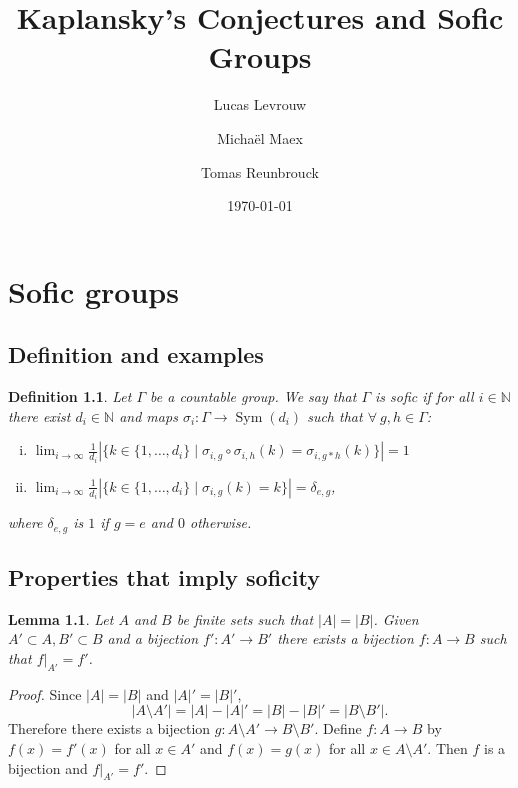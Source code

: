 \documentclass[a4paper]{report}
\author{Lucas Levrouw \and Michaël Maex \and Tomas Reunbrouck}
\title{Kaplansky's Conjectures and Sofic Groups}
\date{\today}
\newcommand{\N}{\mathbb{N}}
\newcommand{\card}[1]{\left| #1 \right|}
\DeclareMathOperator{\sym}{Sym}
\newtheorem{definition}{Definition}
\newtheorem{lemma}{Lemma}
\begin{document}
    \maketitle
    \chapter{Sofic groups}

\section{Definition and examples}

    \begin{definition}\label{def:Sophic}
        Let $\Gamma$ be a countable group. We say that $\Gamma$ is sofic if for all $i\in \N$ there exist $d_i \in \N$ and maps $\sigma_i : \Gamma \to \sym(d_i)$ such that $\forall\ g, h \in \Gamma$:
        \begin{enumerate}[(i)]
            \item $\displaystyle \lim_{i\to \infty} \frac{1}{d_i} \card{\big\{k \in \{1, \dots, d_i\} \mid \sigma_{i,g} \circ \sigma_{i,h}(k) = \sigma_{i, g*h} (k) \big\}} = 1$
            \item $\displaystyle \lim_{i\to \infty} \frac{1}{d_i}  \card{\big\{k \in \{1, \dots, d_i\} \mid \sigma_{i,g}(k) = k \big\}} = \delta_{e,g}$,
        \end{enumerate}
        where $\delta_{e,g}$ is $1$ if $g = e$ and $0$ otherwise.
    \end{definition}





    \section{Properties that imply soficity}

    \begin{lemma}\label{lem:finite_bijections} 
        Let $A$ and $B$ be finite sets such that $|A| = |B|$. Given $A' \subset A, B' \subset B$ and a bijection $f': A' \to B'$ there exists a bijection $f: A \to B$ such that $f|_{A'} = f'$. 
    \end{lemma}
    \begin{proof}
        Since $\card A = \card B$ and $\card A' = \card B'$,
        \[
        \card{A \setminus A'} = \card A - \card A' = \card B - \card B' = \card{B \setminus B'}.
        \]
        Therefore there exists a bijection $g: A \setminus A' \to B \setminus B'$. Define $f: A  \to B$ by $f(x) = f'(x)$ for all $x \in A'$ and $f(x)=g(x)$ for all $x \in A \setminus A'$. Then $f$ is a bijection and $f|_{A'} = f'$.
    \end{proof}
\end{document}
